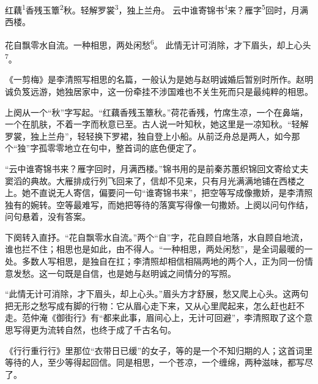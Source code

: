 
\begin{poem}
红藕\textsuperscript{1}香残玉簟\textsuperscript{2}秋。轻解罗裳\textsuperscript{3}，独上兰舟。
云中谁寄锦书\textsuperscript{4}来？雁字\textsuperscript{5}回时，月满西楼。

花自飘零水自流。一种相思，两处闲愁\textsuperscript{6}。
此情无计可消除，才下眉头，却上心头\textsuperscript{7}。
\end{poem}

\begin{annotations}
\end{annotations}

\begin{appreciation}
《一剪梅》是李清照写相思的名篇，一般认为是她与赵明诚婚后暂别时所作。赵明诚负笈远游，她独居家中，这一份牵挂不涉国难也不关生死而只是最纯粹的相思。

上阕从一个“秋”字写起。“红藕香残玉簟秋。”荷花香残，竹席生凉，一个在鼻端，一个在肌肤，不着一字而秋意已至。古人说一叶知秋，她这里是一凉知秋。“轻解罗裳，独上兰舟”，轻轻换下罗裙，独自登上小船。从前泛舟总是两人，如今那个“独”字孤零零地立在句中，整首词的底色便定了。

“云中谁寄锦书来？雁字回时，月满西楼。”锦书用的是前秦苏蕙织锦回文寄给丈夫窦滔的典故。大雁排成行列飞回来了，信却不见来，只有月光满满地铺在西楼之上。她不直说无人寄信，偏要问一句“谁寄锦书来”，把空等写成像撒娇，是李清照独有的婉转。空等最难写，而她把等待的落寞写得像一句撒娇。上阕以问句作结，问句悬着，没有答案。

下阕转入直抒。“花自飘零水自流。”两个“自”字，花自顾自地落，水自顾自地流，谁也拦不住；相思也是如此，由不得人。“一种相思，两处闲愁”，是全词最暖的一处。多数人写相思，是独自在扛；李清照却相信相隔两地的两个人，正为同一份情意发愁。这一句既是自信，也是她与赵明诚之间情分的写照。

“此情无计可消除，才下眉头，却上心头。”眉头方才舒展，愁又爬上心头。这两句把无形之愁写成有脚的行物：它从眉心走下来，又从心里爬起来，怎么赶也赶不走。范仲淹《御街行》有“都来此事，眉间心上，无计可回避”，李清照取了这个意思写得更为流转自然，也终于成了千古名句。

《行行重行行》里那位“衣带日已缓”的女子，等的是一个不知归期的人；这首词里等待的人，至少等得起回信。同是相思，一个苍凉，一个缠绵，两种滋味，都写尽了。
\end{appreciation}
